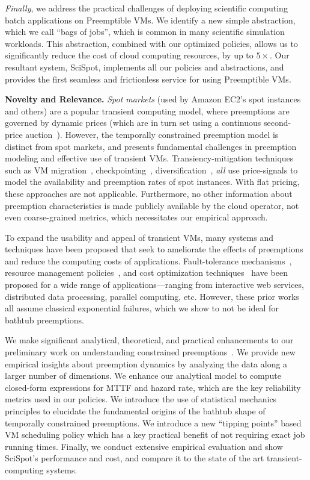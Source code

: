 \emph{Finally}, we address the practical challenges of deploying scientific computing batch applications on Preemptible VMs. 
We identify a new simple abstraction, which we call ``bags of jobs'', which is common in many scientific simulation workloads. 
This abstraction, combined with our optimized policies, allows us to significantly reduce the cost of cloud computing resources, by up to $5\times$.
Our resultant system, SciSpot, implements all our policies and abstractions, and provides the first seamless and frictionless service for using Preemptible VMs. 


\noindent \textbf{Novelty and Relevance.}
%
\emph{Spot markets} (used by Amazon EC2's spot instances and others) are a popular transient computing model, where preemptions are governed by dynamic prices (which are in turn set using a continuous second-price auction~\cite{spot-pricing2}).
However, the temporally constrained preemption model is distinct from spot markets, and presents fundamental challenges in preemption modeling and effective use of transient VMs. 
Transiency-mitigation techniques such as VM migration~\cite{spotcheck}, checkpointing~\cite{flint, marathe2014exploiting}, diversification~\cite{exosphere}, \emph{all} use price-signals to model the availability and preemption rates of spot instances. 
With flat pricing, these approaches are not applicable. 
Furthermore, no other information about preemption characteristics is made publicly available by the cloud operator, not even coarse-grained metrics, which necessitates our empirical approach. 


To expand the usability and appeal of transient VMs, many systems and techniques have been proposed that seek to ameliorate the effects of preemptions and reduce the computing costs of applications. 
Fault-tolerance mechanisms~\cite{spotcheck, marathe2014exploiting}, resource management policies~\cite{exosphere, conductor}, and cost optimization techniques~\cite{dubois2016optispot, shastri2017hotspot} have been proposed for a wide range of applications---ranging from interactive web services, distributed data processing, parallel computing, etc.
However, these prior works all assume classical exponential failures, which we show to not be ideal for bathtub preemptions. 


We make significant analytical, theoretical, and practical enhancements to our preliminary work on understanding constrained preemptions~\cite{scispot-hpdc20}. 
We provide new empirical insights about preemption dynamics by analyzing the data along a larger number of dimensions.
We enhance our analytical model to compute closed-form expressions for MTTF and hazard rate, which are the key reliability metrics used in our policies. 
We introduce the use of statistical mechanics principles to elucidate the fundamental origins of the bathtub shape of temporally constrained preemptions.
We introduce a new ``tipping points'' based VM scheduling policy which has a key practical benefit of not requiring exact job running times. 
Finally, we conduct extensive empirical evaluation and show SciSpot's performance and cost, and compare it to the state of the art transient-computing systems. 



